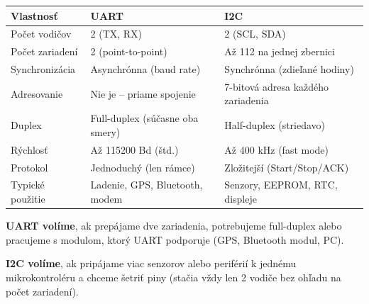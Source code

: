\begin{center}
\begin{tabular}{lll}
\toprule
\textbf{Vlastnosť}    & \textbf{UART}                     & \textbf{I2C} \\
\midrule
Počet vodičov         & 2 (TX, RX)                        & 2 (SCL, SDA) \\
Počet zariadení       & 2 (point-to-point)                & Až 112 na jednej zbernici \\
Synchronizácia        & Asynchrónna (baud rate)           & Synchrónna (zdieľané hodiny) \\
Adresovanie           & Nie je -- priame spojenie         & 7-bitová adresa každého zariadenia \\
Duplex                & Full-duplex (súčasne oba smery)   & Half-duplex (striedavo) \\
Rýchlosť              & Až 115200 Bd (štd.)               & Až 400 kHz (fast mode) \\
Protokol              & Jednoduchý (len rámce)            & Zložitejší (Start/Stop/ACK) \\
Typické použitie      & Ladenie, GPS, Bluetooth, modem    & Senzory, EEPROM, RTC, displeje \\
\bottomrule
\end{tabular}
\end{center}

\textbf{UART volíme}, ak prepájame dve zariadenia, potrebujeme full-duplex alebo pracujeme s modulom, ktorý UART podporuje (GPS, Bluetooth modul, PC).

\textbf{I2C volíme}, ak pripájame viac senzorov alebo periférií k jednému mikrokontroléru a chceme šetriť piny (stačia vždy len 2 vodiče bez ohľadu na počet zariadení).